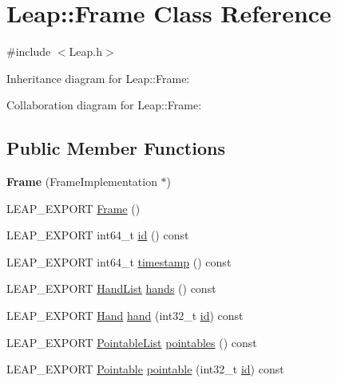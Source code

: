 \hypertarget{class_leap_1_1_frame}{}\section{Leap\+:\+:Frame Class Reference}
\label{class_leap_1_1_frame}


{\ttfamily \#include $<$Leap.\+h$>$}



Inheritance diagram for Leap\+:\+:Frame\+:


Collaboration diagram for Leap\+:\+:Frame\+:
\subsection*{Public Member Functions}
\begin{DoxyCompactItemize}
\item 
\mbox{\label{class_leap_1_1_frame_a95352396f81805bde0b3e1bb76960519}} 
{\bfseries Frame} (Frame\+Implementation $\ast$)
\item 
L\+E\+A\+P\+\_\+\+E\+X\+P\+O\+RT \hyperlink{class_leap_1_1_frame_a6a619578cc80bcdf65f9f332a2432a2f}{Frame} ()
\item 
L\+E\+A\+P\+\_\+\+E\+X\+P\+O\+RT int64\+\_\+t \hyperlink{class_leap_1_1_frame_aac6e1192b900d50c42b3152bb059767f}{id} () const
\item 
L\+E\+A\+P\+\_\+\+E\+X\+P\+O\+RT int64\+\_\+t \hyperlink{class_leap_1_1_frame_a4bcd369dfb07662f074d3fb36902ac70}{timestamp} () const
\item 
L\+E\+A\+P\+\_\+\+E\+X\+P\+O\+RT \hyperlink{class_leap_1_1_hand_list}{Hand\+List} \hyperlink{class_leap_1_1_frame_ad1c4ed839718ce803f8fb884046ff2ca}{hands} () const
\item 
L\+E\+A\+P\+\_\+\+E\+X\+P\+O\+RT \hyperlink{class_leap_1_1_hand}{Hand} \hyperlink{class_leap_1_1_frame_aa5bfff6dba5e38bb779716ec309f1966}{hand} (int32\+\_\+t \hyperlink{class_leap_1_1_frame_aac6e1192b900d50c42b3152bb059767f}{id}) const
\item 
L\+E\+A\+P\+\_\+\+E\+X\+P\+O\+RT \hyperlink{class_leap_1_1_pointable_list}{Pointable\+List} \hyperlink{class_leap_1_1_frame_ae6c7c77ae805bdc6fc30381fa2b2ae3e}{pointables} () const
\item 
L\+E\+A\+P\+\_\+\+E\+X\+P\+O\+RT \hyperlink{class_leap_1_1_pointable}{Pointable} \hyperlink{class_leap_1_1_frame_aa60a6824c815e54fcab21c549c2f77ac}{pointable} (int32\+\_\+t \hyperlink{class_leap_1_1_frame_aac6e1192b900d50c42b3152bb059767f}{id}) const

\end{DoxyCompactItemize}
